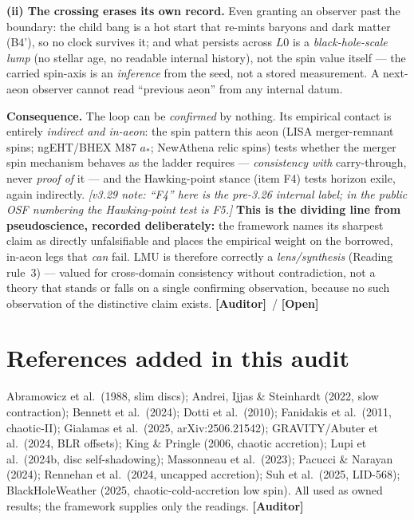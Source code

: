 \documentclass[11pt]{article}
\newcommand{\Open}{\textbf{\textcolor{gray!10!black}{[Open]}}}
\newcommand{\Auditor}{\textbf{\textcolor{teal!55!black}{[Auditor]}}}
\begin{document}
\textbf{(ii) The crossing erases its own record.} Even granting an observer past the boundary: the child bang is a hot start that re-mints baryons and dark matter (B4'), so no clock survives it; and what persists across $L0$ is a \emph{black-hole-scale lump} (no stellar age, no readable internal history), not the spin value itself --- the carried spin-axis is an \emph{inference} from the seed, not a stored measurement. A next-aeon observer cannot read ``previous aeon'' from any internal datum.

\textbf{Consequence.} The loop can be \emph{confirmed} by nothing. Its empirical contact is entirely \emph{indirect and in-aeon}: the spin pattern this aeon (LISA merger-remnant spins; ngEHT/BHEX M87 $a_\ast$; NewAthena relic spins) tests whether the merger spin mechanism behaves as the ladder requires --- \emph{consistency with} carry-through, never \emph{proof of} it --- and the Hawking-point stance (item F4) tests horizon exile, again indirectly. \emph{[v3.29 note: ``F4'' here is the pre-3.26 internal label; in the public OSF numbering the Hawking-point test is F5.]} \textbf{This is the dividing line from pseudoscience, recorded deliberately:} the framework names its sharpest claim as directly unfalsifiable and places the empirical weight on the borrowed, in-aeon legs that \emph{can} fail. LMU is therefore correctly a \emph{lens/synthesis} (Reading rule~3) --- valued for cross-domain consistency without contradiction, not a theory that stands or falls on a single confirming observation, because no such observation of the distinctive claim exists. \Auditor\ / \Open

\section*{References added in this audit}
\small
Abramowicz et al.\ (1988, slim discs); Andrei, Ijjas \& Steinhardt (2022, slow contraction); Bennett et al.\ (2024); Dotti et al.\ (2010); Fanidakis et al.\ (2011, chaotic-II); Gialamas et al.\ (2025, arXiv:2506.21542); GRAVITY/Abuter et al.\ (2024, BLR offsets); King \& Pringle (2006, chaotic accretion); Lupi et al.\ (2024b, disc self-shadowing); Massonneau et al.\ (2023); Pacucci \& Narayan (2024); Rennehan et al.\ (2024, uncapped accretion); Suh et al.\ (2025, LID-568); BlackHoleWeather (2025, chaotic-cold-accretion low spin). All used as owned results; the framework supplies only the readings. \Auditor
\normalsize
\end{document}
